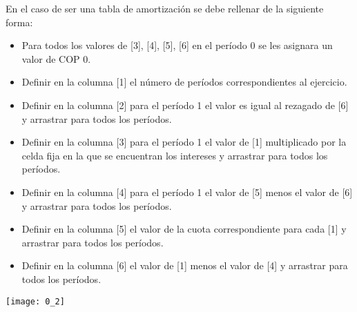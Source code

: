 \begin{enumerate}
	      En el caso de ser una tabla de amortización se debe rellenar de la siguiente forma:
	      \begin{itemize}
		      \color{ForestGreen}
		      \item Para todos los valores de [3], [4], [5], [6] en el período 0 se les asignara un valor de  COP 0.
		      \item Definir en la columna [1] el número de períodos correspondientes al ejercicio.
		      \item Definir en la columna [2] para el período 1 el valor es igual al rezagado de [6] y arrastrar para todos los períodos.
		      \item Definir en la columna [3] para el período 1 el valor de [1] multiplicado por la celda fija en la que se encuentran los intereses y arrastrar para todos los períodos.
		      \item Definir en la columna [4] para el período 1 el valor de [5] menos el valor de [6] y arrastrar para todos los períodos.
		      \item Definir en la columna [5] el valor de la cuota correspondiente para cada [1] y arrastrar para todos los períodos.
		      \item Definir en la columna [6] el valor de [1] menos el valor de [4] y arrastrar para todos los períodos.
	      \end{itemize}
	      \begin{center}
		      \texttt{[image: 0\_2]}
	      \end{center}
	      

\end{enumerate}
